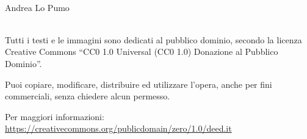 

\leavevmode\\
\textcopyright Andrea Lo Pumo \\
\leavevmode\\

\vfill

Tutti i testi e le immagini sono dedicati al pubblico dominio, secondo la licenza Creative Commons ``CC0 1.0 Universal (CC0 1.0) Donazione al Pubblico Dominio''.

Puoi copiare, modificare, distribuire ed utilizzare l'opera, anche per fini commerciali, senza chiedere alcun permesso.

Per maggiori informazioni: \url{https://creativecommons.org/publicdomain/zero/1.0/deed.it}

\leavevmode\\
\leavevmode\\
\leavevmode\\

